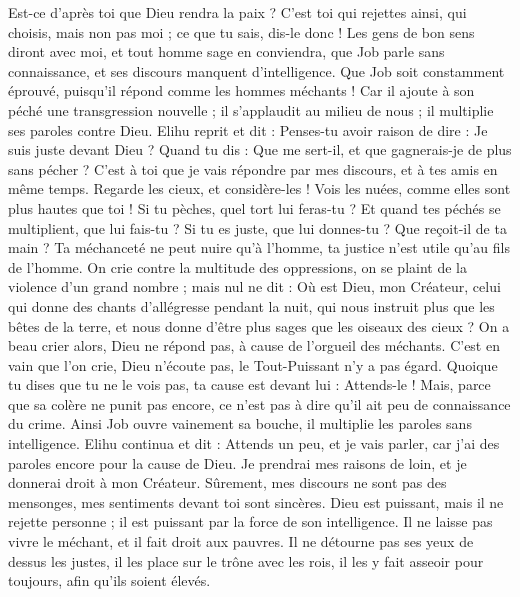 \begin{multicols}{2}
Est-ce d'après toi que Dieu rendra la paix ? C'est toi qui rejettes ainsi, qui choisis, mais non pas moi ; ce que tu sais, dis-le donc !
Les gens de bon sens diront avec moi, et tout homme sage en conviendra,
que Job parle sans connaissance, et ses discours manquent d'intelligence.
Que Job soit constamment éprouvé, puisqu'il répond comme les hommes méchants !
Car il ajoute à son péché une transgression nouvelle ; il s'applaudit au milieu de nous ; il multiplie ses paroles contre Dieu.
\VerseOne{}Elihu reprit et dit :
Penses-tu avoir raison de dire : Je suis juste devant Dieu ?
Quand tu dis : Que me sert-il, et que gagnerais-je de plus sans pécher ?
C'est à toi que je vais répondre par mes discours, et à tes amis en même temps.
Regarde les cieux, et considère-les ! Vois les nuées, comme elles sont plus hautes que toi !
Si tu pèches, quel tort lui feras-tu ? Et quand tes péchés se multiplient, que lui fais-tu ?
Si tu es juste, que lui donnes-tu ? Que reçoit-il de ta main ?
Ta méchanceté ne peut nuire qu'à l'homme, ta justice n'est utile qu'au fils de l'homme.
On crie contre la multitude des oppressions, on se plaint de la violence d'un grand nombre ;
mais nul ne dit : Où est Dieu, mon Créateur, celui qui donne des chants d'allégresse pendant la nuit,
qui nous instruit plus que les bêtes de la terre, et nous donne d'être plus sages que les oiseaux des cieux ?
On a beau crier alors, Dieu ne répond pas, à cause de l'orgueil des méchants.
C'est en vain que l'on crie, Dieu n'écoute pas, le Tout-Puissant n'y a pas égard.
Quoique tu dises que tu ne le vois pas, ta cause est devant lui : Attends-le !
Mais, parce que sa colère ne punit pas encore, ce n'est pas à dire qu'il ait peu de connaissance du crime.
Ainsi Job ouvre vainement sa bouche, il multiplie les paroles sans intelligence.
\VerseOne{}Elihu continua et dit :
Attends un peu, et je vais parler, car j'ai des  paroles encore pour la cause de Dieu.
Je prendrai mes raisons de loin, et je donnerai droit à mon Créateur.
Sûrement, mes discours ne sont pas des mensonges, mes sentiments devant toi sont sincères.
Dieu est puissant, mais il ne rejette personne ; il est puissant par la force de son intelligence.
Il ne laisse pas vivre le méchant, et il fait droit aux pauvres.
Il ne détourne pas ses yeux de dessus les justes, il les place sur le trône avec les rois, il les y fait asseoir pour toujours, afin qu'ils soient élevés.

\end{multicols}
